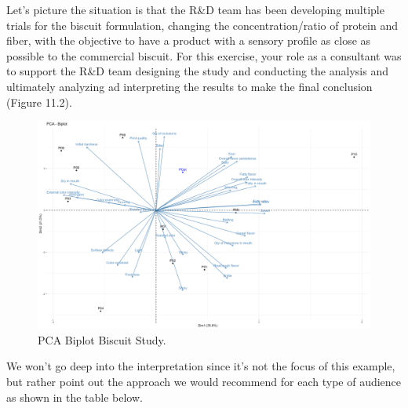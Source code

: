 \documentclass[
]{book}
\begin{document}
Let's picture the situation is that the R\&D team has been developing multiple trials for the biscuit formulation, changing the concentration/ratio of protein and fiber, with the objective to have a product with a sensory profile as close as possible to the commercial biscuit. For this exercise, your role as a consultant was to support the R\&D team designing the study and conducting the analysis and ultimately analyzing ad interpreting the results to make the final conclusion (Figure 11.2).

\begin{figure}

{\centering \includegraphics[width=0.85\linewidth]{images/PCA} 

}

\caption{PCA Biplot Biscuit Study.}\label{fig:pca}
\end{figure}

We won't go deep into the interpretation since it's not the focus of this example, but rather point out the approach we would recommend for each type of audience as shown in the table below.
\end{document}

